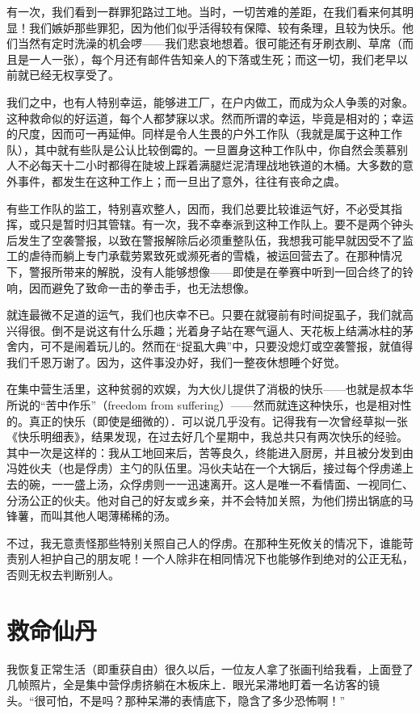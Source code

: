 \documentclass[11pt,oneside]{book}
\begin{document}
\begin{common-format}
有一次，我们看到一群罪犯路过工地。当时，一切苦难的差距，在我们看来何其明显！我们嫉妒那些罪犯，因为他们似乎活得较有保障、较有条理，且较为快乐。他们当然有定时洗澡的机会啰——我们悲哀地想着。很可能还有牙刷衣刷、草席（而且是一人一张），每个月还有邮件告知亲人的下落或生死；而这一切，我们老早以前就已经无权享受了。

我们之中，也有人特别幸运，能够进工厂，在户内做工，而成为众人争羡的对象。这种救命似的好运道，每个人都梦寐以求。然而所谓的幸运，毕竟是相对的；幸运的尺度，因而可一再延伸。同样是令人生畏的户外工作队（我就是属于这种工作队），其中就有些队是公认比较倒霉的。一旦置身这种工作队中，你自然会羡慕别人不必每天十二小时都得在陡坡上踩着满腿烂泥清理战地铁道的木桶。大多数的意外事件，都发生在这种工作上；而一旦出了意外，往往有丧命之虞。

有些工作队的监工，特别喜欢整人，因而，我们总要比较谁运气好，不必受其指挥，或只是暂时归其管辖。有一次，我不幸奉派到这种工作队上。要不是两个钟头后发生了空袭警报，以致在警报解除后必须重整队伍，我想我可能早就因受不了监工的虐待而躺上专门承载劳累致死或濒死者的雪橇，被运回营去了。在那种情况下，警报所带来的解脱，没有人能够想像——即使是在拳赛中听到一回合终了的铃响，因而避免了致命一击的拳击手，也无法想像。

就连最微不足道的运气，我们也庆幸不已。只要在就寝前有时间捉虱子，我们就高兴得很。倒不是说这有什么乐趣；光着身子站在寒气逼人、天花板上结满冰柱的茅舍内，可不是闹着玩儿的。然而在“捉虱大典”中，只要没熄灯或空袭警报，就值得我们千恩万谢了。因为，这件事没办好，我们一整夜休想睡个好觉。

在集中营生活里，这种贫弱的欢娱，为大伙儿提供了消极的快乐——也就是叔本华所说的“苦中作乐”（freedom from suffering）——然而就连这种快乐，也是相对性的。真正的快乐（即使是细微的）．可以说几乎没有。记得我有一次曾经草拟一张《快乐明细表》，结果发现，在过去好几个星期中，我总共只有两次快乐的经验。其中一次是这样的：我从工地回来后，苦等良久，终能进入厨房，并且被分发到由冯姓伙夫（也是俘虏）主勺的队伍里。冯伙夫站在一个大锅后，接过每个俘虏递上去的碗，一一盛上汤，众俘虏则一一迅速离开。这人是唯一不看情面、一视同仁、分汤公正的伙夫。他对自己的好友或乡亲，并不会特加关照，为他们捞出锅底的马锋薯，而叫其他人喝薄稀稀的汤。

不过，我无意责怪那些特别关照自己人的俘虏。在那种生死攸关的情况下，谁能苛责别人袒护自己的朋友呢！一个人除非在相同情况下也能够作到绝对的公正无私，否则无权去判断别人。


\section{救命仙丹}
我恢复正常生活（即重获自由）很久以后，一位友人拿了张画刊给我看，上面登了几帧照片，全是集中营俘虏挤躺在木板床上．眼光呆滞地盯着一名访客的镜头。“很可怕，不是吗？那种呆滞的表情底下，隐含了多少恐怖啊！”


\end{common-format}
\end{document}
